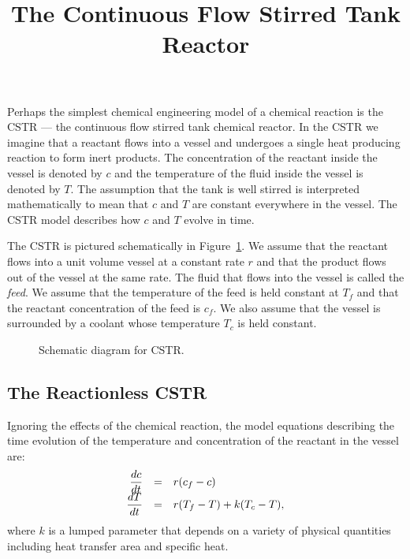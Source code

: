 \documentclass{ximera}
\title{The Continuous Flow Stirred Tank Reactor}
\begin{document}
\begin{abstract}
\end{abstract}
\maketitle

 
\label{S:CSTR} 

Perhaps the simplest chemical engineering model of a chemical
reaction is the CSTR --- the continuous flow stirred tank
chemical reactor.  In the CSTR we imagine that a reactant flows
into a vessel and undergoes a single heat producing reaction to
form inert products.  The concentration of the reactant inside
the vessel is denoted by $c$ and the temperature of the fluid
inside the vessel is denoted by $T$.  The assumption that the
tank is well stirred is interpreted mathematically to mean that
$c$ and $T$ are constant everywhere in the vessel.  The CSTR
model describes how $c$ and $T$ evolve in time. 

The CSTR is pictured schematically in Figure~\ref{F:CSTRs}.  We assume 
that the reactant flows into a unit volume vessel at a constant rate 
$r$ and that the product flows out of the vessel at the same rate.  
The fluid that flows into the vessel is called the {\em feed\/}.  
We assume that the temperature of the feed is held constant at
$T_f$ and that the reactant concentration of the feed is $c_f$.
We also assume that the vessel is surrounded by a coolant whose
temperature $T_c$ is held constant.  

\begin{figure}[htb]
           \centerline{%
	   }
           \caption{Schematic diagram for CSTR.}
           \label{F:CSTRs}
\end{figure}


\subsection*{The Reactionless CSTR}

Ignoring the effects of the chemical reaction, the model
equations describing the time evolution of the temperature and
concentration of the reactant in the vessel are:
\arraystart
\begin{equation} \label{e:CSTRlin}
\begin{array}{rcl}
\displaystyle\frac{dc}{dt} & = & r(c_f-c) \\
\displaystyle\frac{dT}{dt} & = & r(T_f-T) + k(T_c-T),
\end{array}
\end{equation}
\arrayfinish   {} 
where $k$ is a lumped parameter that depends on a variety of
physical quantities including heat transfer area and specific
heat.  
\end{document}
